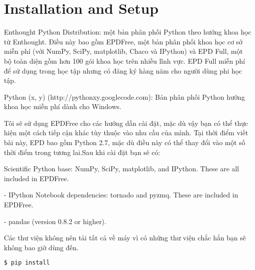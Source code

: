 \section{Installation and Setup}
Enthought Python Distribution: một bản phân phối Python theo hướng khoa học từ Enthought. Điều này bao gồm EPDFree, một bản phân phối khoa học cơ sở miễn phí (với NumPy, SciPy, matplotlib, Chaco và IPython) và EPD Full, một bộ toàn diện gồm hơn 100 gói khoa học trên nhiều lĩnh vực. EPD Full miễn phí để sử dụng trong học tập nhưng có đăng ký hàng năm cho người dùng phi học tập.\par
Python (x, y) (http://pythonxy.googlecode.com): Bản phân phối Python hướng khoa học miễn phí dành cho Windows.\par
Tôi sẽ sử dụng EPDFree cho các hướng dẫn cài đặt, mặc dù vậy bạn có thể thực hiện một cách tiếp cận khác tùy thuộc vào nhu cầu của mình. Tại thời điểm viết bài này, EPD bao gồm Python 2.7, mặc dù điều này có thể thay đổi vào một số thời điểm trong tương lai.Sau khi cài đặt bạn sẽ có: \par
Scientific Python base: NumPy, SciPy, matplotlib, and IPython. These are all included in EPDFree.\par
- IPython Notebook dependencies: tornado and pyzmq. These are included in EPDFree.\par
- pandas (version 0.8.2 or higher).\par
Các thư viện không nên tải tất cả về máy vì có những thư viện chắc hẳn bạn sẽ không bao giờ dùng đến.
\begin{lstlisting}[language=bash]
  $ pip install
\end{lstlisting}


